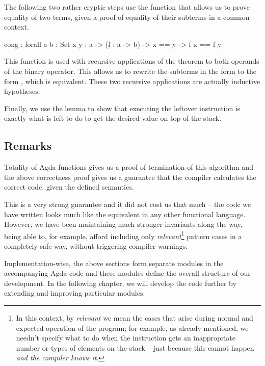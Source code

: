 The following two rather cryptic steps use the function  that allows
us to prove equality of two terms, given a proof of equality of their subterms
in a common context.

\begin{code}
  cong : forall {a b : Set} {x y : a}
    -> (f : a -> b)
    -> x == y -> f x == f y
\end{code}

\noindent This function is used with recursive applications of the theorem
 to both operands of the binary operator. This allows us
to rewrite the subterms in the form 
to the form , which is equivalent. These
two recursive applications are actually inductive hypotheses.


Finally, we use the lemma  to show that executing the
leftover instruction is exactly what is left to do to get the desired value
on top of the stack.

\subsection{Remarks}

Totality of Agda functions gives us a proof of termination of this algorithm and
the above correctness proof gives us a guarantee that the compiler calculates
the correct code, given the defined semantics.

This is a very strong guarantee and it did not cost us that much -- the code we
have written looks much like the equivalent in any other functional language.
However, we have been maintaining much stronger invariants along the way, being
able to, for example, afford including only \emph{relevant}\footnote{In this
  context, by \emph{relevant} we mean the cases that arise during normal and
  expected operation of the program; for example, as already mentioned, we
needn't specify what to do when the instruction  gets an
inappropriate number or types of elements on the stack -- just because this
cannot happen \emph{and the compiler knows it}.} pattern cases in a completely
safe way, without triggering compiler warnings.

Implementation-wise, the above sections form separate modules in the
accompanying Agda code and these modules define the overall structure of our
development. In the following chapter, we will develop
the code further by extending and improving particular modules.



